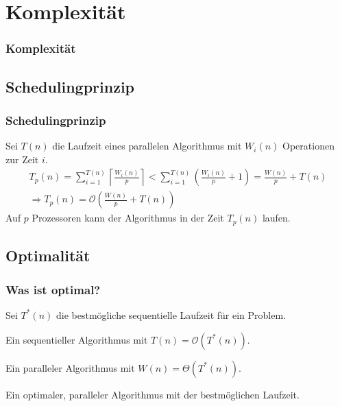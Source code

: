 \section{Komplexität}
\begin{frame}
    \frametitle{Komplexität}
    \tableofcontents[
        currentsection,
        hideothersubsections,
        sectionstyle=show/shaded,
    ]
\end{frame}

\subsection{Schedulingprinzip}
\begin{frame}
    \frametitle{Schedulingprinzip}
    Sei $T(n)$ die Laufzeit eines parallelen Algorithmus mit $W_i(n)$
    Operationen zur Zeit $i$.
    \pause
    \begin{equation}
        \begin{gathered}
            T_p(n) = \sum_{i=1}^{T(n)} \left\lceil \frac{W_i(n)}{p} \right\rceil
            <
            \sum_{i=1}^{T(n)} \left( \frac{W_i(n)}{p} + 1 \right)
            = \frac{W(n)}{p} + T(n) \\
            \Rightarrow T_p(n) = \mathcal{O} \left( \frac{W(n)}{p} + T(n) \right)
        \end{gathered}
    \end{equation}
    Auf $p$ Prozessoren kann der Algorithmus in der Zeit $T_p(n)$ laufen.
\end{frame}

\subsection{Optimalität}
\begin{frame}
    \frametitle{Was ist optimal?}
    Sei $T^\ast(n)$ die bestmögliche sequentielle Laufzeit für ein Problem.
    \pause
    \begin{definition}
        Ein sequentieller Algorithmus mit $T(n) = \mathcal{O}(T^\ast(n))$.
    \end{definition}
    \pause
    \begin{definition}[optimal]
        Ein paralleler Algorithmus mit $W(n) = \Theta(T^\ast(n))$.
    \end{definition}
    \pause
    \begin{definition}
        Ein optimaler, paralleler Algorithmus mit der bestmöglichen Laufzeit.
    \end{definition}
\end{frame}

